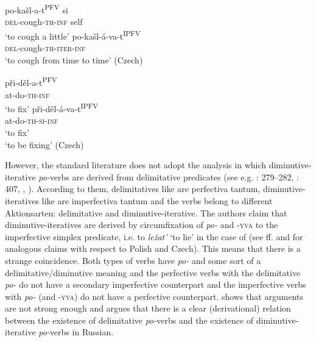 \documentclass[output=paper,colorlinks,citecolor=brown]{langscibook}
\begin{document}
\ea\label{biskup:ex:dimin-cz1}\ea\gll po-kašl-a-t\textsuperscript{PFV} si\\
\textsc{del}-cough-\textsc{th-inf} self\\
\glt ‘to cough a little’ \label{biskup:ex:dimin-cz1.a}
\ex\gll po-kašl-á-va-t\textsuperscript{IPFV}\\
\textsc{del}-cough-\textsc{th-iter-inf}\\
\glt ‘to cough from time to time’ \hfill (Czech) \label{biskup:ex:dimin-cz1.b}
\z\z

\ea\label{biskup:ex:dimin-cz2}\ea\gll při-děl-a-t\textsuperscript{PFV}\\
at-do-\textsc{th-inf}\\
\glt ‘to fix’ \label{biskup:ex:dimin-cz2.a}
\ex\gll při-děl-á-va-t\textsuperscript{IPFV}\\
at-do-\textsc{th-si-inf}\\
\glt ‘to fix’ \\ ‘to be fixing’ \hfill (Czech) \label{biskup:ex:dimin-cz2.b}
\z\z

\noindent However, the standard literature does not adopt the analysis in which diminutive-iterative \textit{po-}verbs are derived from delimitative predicates (see e.g. \citealt{Isacenko1960}: 279--282, \citeyear{Isačenko1962}: 407, \citealt[600]{bis:Svedova1980}, \citealt[94, 104]{Zaliznjak.Smelev1997}). According to them, delimitatives like  are perfectiva tantum, diminutive-iteratives like  are imperfectiva tantum and the verbs belong to different Aktionsarten: delimitative and diminutive-iterative. The authors claim that diminutive-iter\-a\-tives are derived by circumfixation of \textit{po-} and \textsc{-yva} to the imperfective simplex predicate, i.e. to \textit{ležat'} ‘to lie’ in the case of  (see \citealt[58]{Katny1994}ff. and \citealt[419]{Petr1986} for analogous claims with respect to Polish and Czech). This means that there is a strange coincidence. Both types of verbs have \textit{po-} and some sort of a delimitative/diminutive meaning and the perfective verbs with the delimitative \textit{po-} do not have a secondary imperfective counterpart and the imperfective verbs with \textit{po-} (and \textsc{-yva}) do not have a perfective counterpart. \citet[133--134]{Tatevosov2009} shows that  arguments are not strong enough and argues that there is a clear (derivational) relation between the existence of delimitative \textit{po-}verbs and the existence of diminutive-iterative \textit{po-}verbs in Russian.
\end{document}
